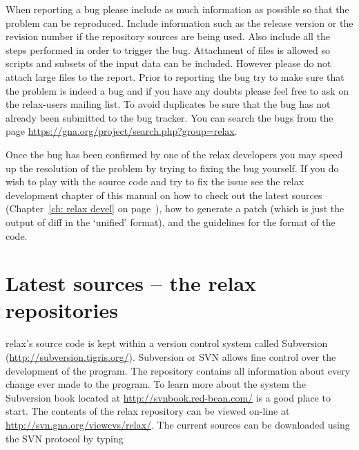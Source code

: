When reporting a bug please include as much information as possible so that the problem can be reproduced.  Include information such as the release version or the revision number if the repository sources are being used.  Also include all the steps performed in order to trigger the bug.  Attachment of files is allowed so scripts and subsets of the input data can be included.  However please do not attach large files to the report.  Prior to reporting the bug try to make sure that the problem is indeed a bug and if you have any doubts please feel free to ask on the relax-users mailing list.  To avoid duplicates be sure that the bug has not already been submitted to the bug tracker.  You can search the bugs from the page \href{https://gna.org/project/search.php?group=relax}{https://gna.org/project/search.php?group=relax}.

Once the bug has been confirmed by one of the relax developers you may speed up the resolution of the problem by trying to fixing the bug yourself.  If you do wish to play with the source code and try to fix the issue see the relax development chapter of this manual on how to check out the latest sources (Chapter~\ref{ch: relax devel} on page~\pageref{ch: relax devel}), how to generate a patch (which is just the output of diff in the `unified' format), and the guidelines for the format of the code.




\section{Latest sources -- the relax repositories}

relax's source code is kept within a version control system called Subversion (\href{http://subversion.tigris.org/}{http://subversion.tigris.org/}).  Subversion or SVN allows fine control over the development of the program.  The repository contains all information about every change ever made to the program.  To learn more about the system the Subversion book located at \href{http://svnbook.red-bean.com/}{http://svnbook.red-bean.com/} is a good place to start.  The contents of the relax repository can be viewed on-line at \href{http://svn.gna.org/viewcvs/relax/}{http://svn.gna.org/viewcvs/relax/}.  The current sources can be downloaded using the SVN protocol by typing

